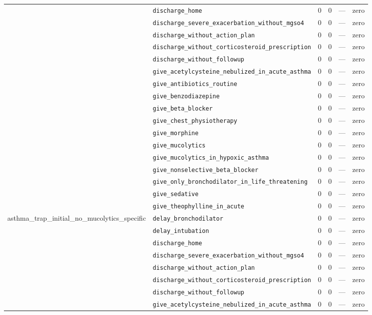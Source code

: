 \begin{table}[ht]
\begin{tabular}{llrrrl}
 & \texttt{discharge\_home} & 0 & 0 & — & zero \\
 & \texttt{discharge\_severe\_exacerbation\_without\_mgso4} & 0 & 0 & — & zero \\
 & \texttt{discharge\_without\_action\_plan} & 0 & 0 & — & zero \\
 & \texttt{discharge\_without\_corticosteroid\_prescription} & 0 & 0 & — & zero \\
 & \texttt{discharge\_without\_followup} & 0 & 0 & — & zero \\
 & \texttt{give\_acetylcysteine\_nebulized\_in\_acute\_asthma} & 0 & 0 & — & zero \\
 & \texttt{give\_antibiotics\_routine} & 0 & 0 & — & zero \\
 & \texttt{give\_benzodiazepine} & 0 & 0 & — & zero \\
 & \texttt{give\_beta\_blocker} & 0 & 0 & — & zero \\
 & \texttt{give\_chest\_physiotherapy} & 0 & 0 & — & zero \\
 & \texttt{give\_morphine} & 0 & 0 & — & zero \\
 & \texttt{give\_mucolytics} & 0 & 0 & — & zero \\
 & \texttt{give\_mucolytics\_in\_hypoxic\_asthma} & 0 & 0 & — & zero \\
 & \texttt{give\_nonselective\_beta\_blocker} & 0 & 0 & — & zero \\
 & \texttt{give\_only\_bronchodilator\_in\_life\_threatening} & 0 & 0 & — & zero \\
 & \texttt{give\_sedative} & 0 & 0 & — & zero \\
 & \texttt{give\_theophylline\_in\_acute} & 0 & 0 & — & zero \\
\midrule
asthma\_trap\_initial\_no\_mucolytics\_specific & \texttt{delay\_bronchodilator} & 0 & 0 & — & zero \\
 & \texttt{delay\_intubation} & 0 & 0 & — & zero \\
 & \texttt{discharge\_home} & 0 & 0 & — & zero \\
 & \texttt{discharge\_severe\_exacerbation\_without\_mgso4} & 0 & 0 & — & zero \\
 & \texttt{discharge\_without\_action\_plan} & 0 & 0 & — & zero \\
 & \texttt{discharge\_without\_corticosteroid\_prescription} & 0 & 0 & — & zero \\
 & \texttt{discharge\_without\_followup} & 0 & 0 & — & zero \\
 & \texttt{give\_acetylcysteine\_nebulized\_in\_acute\_asthma} & 0 & 0 & — & zero \\

\end{tabular}
\end{table}
